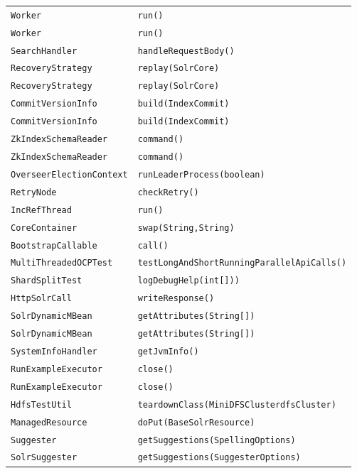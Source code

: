 \begin{center}
\begin{longtable}{ll}
\lstinline/Worker/&{\lstinline/run()/}\\
\lstinline/Worker/&{\lstinline/run()/}\\
\lstinline/SearchHandler/&{\lstinline/handleRequestBody()/}\\
\lstinline/RecoveryStrategy/&{\lstinline/replay(SolrCore)/}\\
\lstinline/RecoveryStrategy/&{\lstinline/replay(SolrCore)/}\\
\lstinline/CommitVersionInfo/&{\lstinline/build(IndexCommit)/}\\
\lstinline/CommitVersionInfo/&{\lstinline/build(IndexCommit)/}\\
\lstinline/ZkIndexSchemaReader/&{\lstinline/command()/}\\
\lstinline/ZkIndexSchemaReader/&{\lstinline/command()/}\\
\lstinline/OverseerElectionContext/&{\lstinline/runLeaderProcess(boolean)/}\\
\lstinline/RetryNode/&{\lstinline/checkRetry()/}\\
\lstinline/IncRefThread/&{\lstinline/run()/}\\
\lstinline/CoreContainer/&{\lstinline/swap(String,String)/}\\
\lstinline/BootstrapCallable/&{\lstinline/call()/}\\
\lstinline/MultiThreadedOCPTest/&{\lstinline/testLongAndShortRunningParallelApiCalls()/}\\
\lstinline/ShardSplitTest/&{\lstinline/logDebugHelp(int[]))/}\\
\lstinline/HttpSolrCall/&{\lstinline/writeResponse()/}\\
\lstinline/SolrDynamicMBean/&{\lstinline/getAttributes(String[])/}\\
\lstinline/SolrDynamicMBean/&{\lstinline/getAttributes(String[])/}\\
\lstinline/SystemInfoHandler/&{\lstinline/getJvmInfo()/}\\
\lstinline/RunExampleExecutor/&{\lstinline/close()/}\\
\lstinline/RunExampleExecutor/&{\lstinline/close()/}\\
\lstinline/HdfsTestUtil/&{\lstinline/teardownClass(MiniDFSClusterdfsCluster)/}\\
\lstinline/ManagedResource/&{\lstinline/doPut(BaseSolrResource)/}\\
\lstinline/Suggester/&{\lstinline/getSuggestions(SpellingOptions)/}\\
\lstinline/SolrSuggester/&{\lstinline/getSuggestions(SuggesterOptions)/}\\

\end{longtable}
\end{center}
